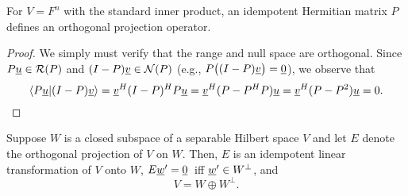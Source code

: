 \begin{theorem}
For $V=F^n$ with the standard inner product, an idempotent Hermitian matrix $P$ defines an orthogonal projection operator.
\end{theorem}
\begin{proof}
We simply must verify that the range and null space are orthogonal.
Since $P \underline{u} \in \mathcal{R}(P)$ and $(I-P) \underline{v} \in \mathcal{N}(P)$ (e.g., $P\big((I-P)\underline{v}\big)=\underline{0}$), we observe that
\[ \langle P\underline{u} | (I-P)\underline{v} \rangle = \underline{v}^H (I-P)^H P \underline{u} = \underline{v}^H (P - P^H P) \underline{u} = \underline{v}^H (P - P^2) \underline{u} = 0. \]
\end{proof}

\begin{theorem} \label{theorem:OrthogonalSubspaceDirectSum}
Suppose $W$ is a closed subspace of a separable Hilbert space $V$ and let $E$ denote the orthogonal projection of $V$ on $W$.
Then, $E$ is an idempotent linear transformation of $V$ onto $W$, $E \underline{w}' = \underline{0}\,$ iff $\underline{w}' \in W^{\bot}$, and
\begin{equation*}
V = W \oplus W^{\bot}.
\end{equation*}
\end{theorem}
